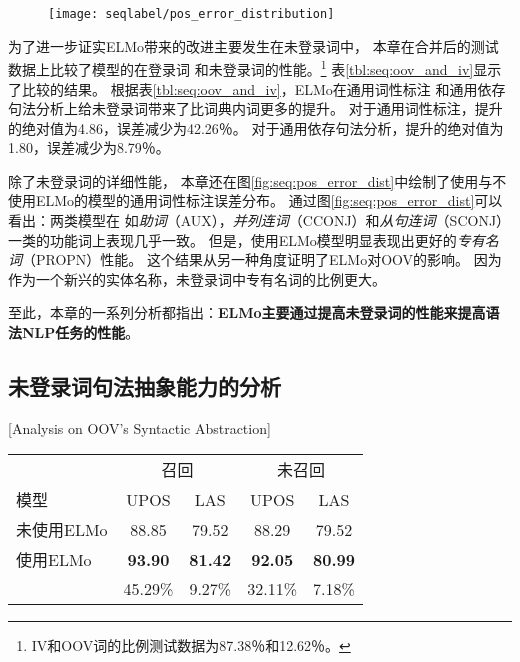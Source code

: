 \begin{figure}[t]
	\texttt{[image: seqlabel/pos\_error\_distribution]}
\end{figure}

为了进一步证实ELMo带来的改进主要发生在未登录词中，
本章在合并后的测试数据上比较了模型的在登录词
和未登录词的性能。\footnote{IV和OOV词的比例测试数据为87.38％和12.62％。}
表\ref {tbl:seq:oov_and_iv}显示了比较的结果。
根据表\ref{tbl:seq:oov_and_iv}，ELMo在通用词性标注
和通用依存句法分析上给未登录词带来了比词典内词更多的提升。
对于通用词性标注，提升的绝对值为4.86，误差减少为42.26％。
对于通用依存句法分析，提升的绝对值为1.80，误差减少为8.79％。

除了未登录词的详细性能，
本章还在图\ref {fig:seq:pos_error_dist}中绘制了使用与不使用ELMo的模型的通用词性标注误差分布。
通过图\ref{fig:seq:pos_error_dist}可以看出：两类模型在
如\textit{助词}（AUX），\textit{并列连词}（CCONJ）和\textit{从句连词}（SCONJ）
一类的功能词上表现几乎一致。
但是，使用ELMo模型明显表现出更好的\textit{专有名词}（PROPN）性能。
这个结果从另一种角度证明了ELMo对OOV的影响。
因为作为一个新兴的实体名称，未登录词中专有名词的比例更大。

至此，本章的一系列分析都指出：\textbf{ELMo主要通过提高未登录词的性能来提高语法NLP任务的性能}。

\subsection{未登录词句法抽象能力的分析}[Analysis on OOV's Syntactic Abstraction]\label{sec:seq:anal:abstration}
\begin{table}[t]
	\vspace{0.5em}\centering\wuhao
	\begin{tabular}{lcc cc}
		\toprule[1.5pt]
		& \multicolumn{2}{c}{召回} & \multicolumn{2}{c}{未召回}  \\
		模型 & UPOS & LAS & UPOS & LAS  \\
		\midrule[1pt]
		未使用ELMo & 88.85 & 79.52 & 88.29 & 79.52 \\
		使用ELMo & \textbf{93.90} &  \textbf{81.42} & \textbf{92.05} & \textbf{80.99} \\
		& 45.29\% & 9.27\% & 32.11\% & 7.18\% \\
		\bottomrule[1.5pt]
	\end{tabular}
\end{table}

